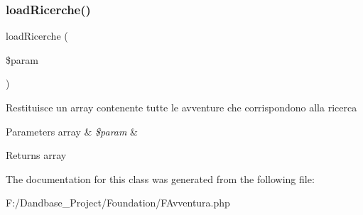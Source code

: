 \subsubsection{\texorpdfstring{load\+Ricerche()}{loadRicerche()}}
{\footnotesize\ttfamily load\+Ricerche (\begin{DoxyParamCaption}\item[{}]{\$param }\end{DoxyParamCaption})}

Restituisce un array contenente tutte le avventure che corrispondono alla ricerca


\begin{DoxyParams}[1]{Parameters}
array & {\em \$param} & \\
\hline
\end{DoxyParams}
\begin{DoxyReturn}{Returns}
array 
\end{DoxyReturn}


The documentation for this class was generated from the following file\+:\begin{DoxyCompactItemize}
\item 
F\+:/\+Dandbase\+\_\+\+Project/\+Foundation/F\+Avventura.\+php\end{DoxyCompactItemize}
